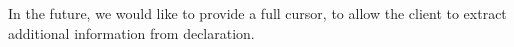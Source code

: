 
\begin{DoxyRefList}
\item[\label{todo__todo000001}%
\Hypertarget{todo__todo000001}%
Member \mbox{\hyperlink{structCXCompletionResult_adfd21960b683399da375ff0ed10527b7}{C\+X\+Completion\+Result\+:\+:Cursor\+Kind}} ]In the future, we would like to provide a full cursor, to allow the client to extract additional information from declaration. 
\end{DoxyRefList}